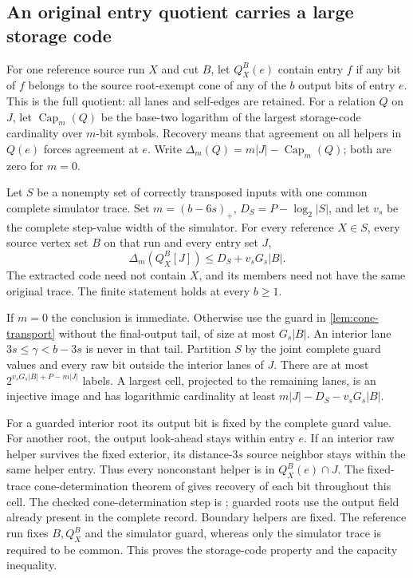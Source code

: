 \subsection{An original entry quotient carries a large storage code}

For one reference source run $X$ and cut $B$, let $Q_X^B(e)$ contain entry $f$
if any bit of $f$ belongs to the source root-exempt cone of any of the $b$
output bits of entry $e$. This is the full quotient: all lanes and self-edges
are retained. For a relation $Q$ on $J$, let $\operatorname{Cap}_m(Q)$ be the
base-two logarithm of the largest storage-code cardinality over $m$-bit symbols.
Recovery means that agreement on all helpers in $Q(e)$ forces agreement at $e$.
Write $\Delta_m(Q)=m|J|-\operatorname{Cap}_m(Q)$; both are zero for $m=0$.

\begin{theorem}\label{thm:original-entry-capacity}
Let $S$ be a nonempty set of correctly transposed inputs with one common complete
simulator trace. Set $m=(b-6s)_+$, $D_S=P-\log_2|S|$, and let $v_s$ be the
complete step-value width of the simulator. For every reference $X\in S$,
every source vertex set $B$ on that run and every entry set $J$,
\[
 \Delta_m(Q_X^B[J])\le D_S+v_sG_s|B|.
\]
The extracted code need not contain $X$, and its members need not have the same
original trace. The finite statement holds at every $b\ge1$.
\end{theorem}
\begin{outline}
If $m=0$ the conclusion is immediate. Otherwise use the guard in
\cref{lem:cone-transport} without the final-output tail, of size at most
$G_s|B|$. An interior lane $3s\le\gamma<b-3s$ is never in that tail. Partition
$S$ by the joint complete guard values and every raw bit outside the interior
lanes of $J$. There are at most $2^{v_sG_s|B|+P-m|J|}$ labels. A largest cell,
projected to the remaining lanes, is an injective image and has logarithmic
cardinality at least $m|J|-D_S-v_sG_s|B|$.

For a guarded interior root its output bit is fixed by the complete guard
value. For another root, the output look-ahead stays within entry $e$. If an
interior raw helper survives the fixed exterior, its distance-$3s$ source
neighbor stays within the same helper entry. Thus every nonconstant helper
is in $Q_X^B(e)\cap J$. The fixed-trace cone-determination theorem of
\cite{MacroscopicCrossings2026} gives recovery of each bit throughout this
cell. The checked cone-determination step is
; guarded roots use the output field already
present in the complete record. Boundary helpers are fixed. The reference run fixes $B,Q_X^B$ and the
simulator guard, whereas only the simulator trace is required to be common.
This proves the storage-code property and the capacity inequality.
\end{outline}

